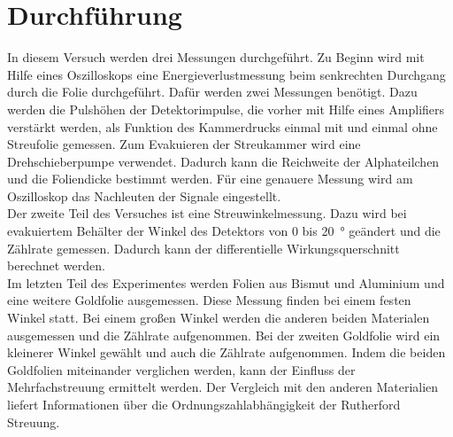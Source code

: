 \section{Durchführung}
In diesem Versuch werden drei Messungen durchgeführt.
Zu Beginn wird mit Hilfe eines Oszilloskops eine Energieverlustmessung beim
senkrechten Durchgang durch die Folie durchgeführt. Dafür werden zwei Messungen
benötigt. Dazu werden die Pulshöhen der Detektorimpulse, die vorher mit Hilfe
eines Amplifiers verstärkt werden, als Funktion des Kammerdrucks einmal mit und
einmal ohne Streufolie gemessen. Zum Evakuieren der Streukammer wird eine
Drehschieberpumpe verwendet. Dadurch kann die Reichweite der Alphateilchen und
die Foliendicke bestimmt werden. Für eine genauere Messung wird am Oszilloskop
das Nachleuten der Signale eingestellt. \\
Der zweite Teil des Versuches ist eine Streuwinkelmessung. Dazu wird bei
evakuiertem Behälter der Winkel des Detektors von $0$ bis \SI{20}{\degree}
geändert und die Zählrate gemessen. Dadurch kann der differentielle
Wirkungsquerschnitt berechnet werden. \\
Im letzten Teil des Experimentes werden Folien aus Bismut und Aluminium und eine
weitere Goldfolie ausgemessen. Diese Messung finden bei einem festen Winkel statt.
Bei einem großen Winkel werden die anderen beiden Materialen ausgemessen und die
Zählrate aufgenommen. Bei der zweiten Goldfolie wird ein kleinerer Winkel
gewählt und auch die Zählrate aufgenommen. Indem die beiden Goldfolien miteinander
verglichen werden, kann der Einfluss der Mehrfachstreuung ermittelt werden. Der
Vergleich mit den anderen Materialien liefert Informationen über die
Ordnungszahlabhängigkeit der Rutherford Streuung.
